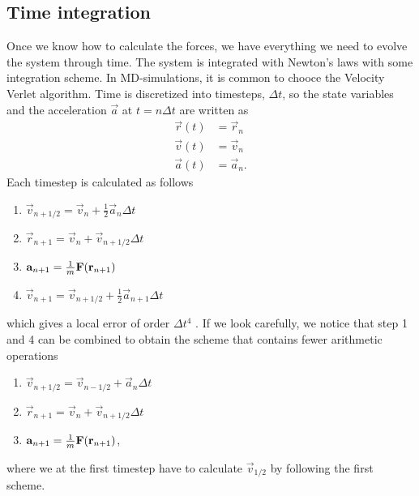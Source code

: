\subsection{Time integration}
Once we know how to calculate the forces, we have everything we need to evolve the system through time. The system is integrated with Newton's laws with some integration scheme. In MD-simulations, it is common to chooce the Velocity Verlet algorithm. Time is discretized into timesteps, $\Delta t$, so the state variables and the acceleration $\vec a$ at $t=n\Delta t$ are written as
\begin{align*}
	\vec r(t) & = \vec r_n\\
	\vec v(t) & = \vec v_n\\
	\vec a(t) & = \vec a_n.
\end{align*}
Each timestep is calculated as follows
\begin{enumerate}
	\item $\vec v_{n+1/2} = \vec v_{n} + \frac{1}{2}\vec a_{n}\Delta t$
	\item $\vec r_{n+1} = \vec v_{n} + \vec v_{n+1/2}\Delta t$
	\item $\vec a_{n+1} = {1\over m}\vec F(\vec r_{n+1})$
	\item $\vec v_{n+1}   = \vec v_{n+1/2} + \frac{1}{2}\vec a_{n+1}\Delta t$
\end{enumerate}
which gives a local error of order $\Delta t^4$ \cite{allen1989computer}. If we look carefully, we notice that step 1 and 4 can be combined to obtain the scheme that contains fewer arithmetic operations
\begin{enumerate}
	\item $\vec v_{n+1/2} = \vec v_{n-1/2} + \vec a_{n}\Delta t$
	\item $\vec r_{n+1} = \vec v_{n} + \vec v_{n+1/2}\Delta t$
	\item $\vec a_{n+1} = {1\over m}\vec F(\vec r_{n+1})$,
\end{enumerate}
where we at the first timestep have to calculate $\vec v_{1/2}$ by following the first scheme.


